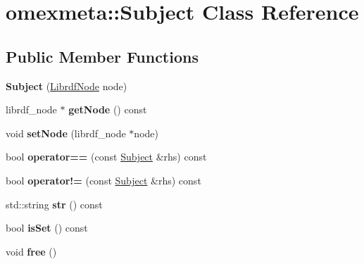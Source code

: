 \hypertarget{classomexmeta_1_1Subject}{}\section{omexmeta\+:\+:Subject Class Reference}
\label{classomexmeta_1_1Subject}
\subsection*{Public Member Functions}
\begin{DoxyCompactItemize}
\item 
\mbox{\label{classomexmeta_1_1Subject_a4e80ab7745a8c2cf6628e8e93a95cdac}} 
{\bfseries Subject} (\hyperlink{classredland_1_1LibrdfNode}{Librdf\+Node} node)
\item 
\mbox{\label{classomexmeta_1_1Subject_a91ea148978a5320dfba19bdb1bdbdd90}} 
librdf\+\_\+node $\ast$ {\bfseries get\+Node} () const
\item 
\mbox{\label{classomexmeta_1_1Subject_aa04b4e973bd7df44fffe588e31b8779f}} 
void {\bfseries set\+Node} (librdf\+\_\+node $\ast$node)
\item 
\mbox{\label{classomexmeta_1_1Subject_a1b170dceee7bf297843da5b201e06693}} 
bool {\bfseries operator==} (const \hyperlink{classomexmeta_1_1Subject}{Subject} \&rhs) const
\item 
\mbox{\label{classomexmeta_1_1Subject_a3729c201061ff27fc50b1ae2412dab2b}} 
bool {\bfseries operator!=} (const \hyperlink{classomexmeta_1_1Subject}{Subject} \&rhs) const
\item 
\mbox{\label{classomexmeta_1_1Subject_a3aa59bfd78d3c6e138beb386d846a584}} 
std\+::string {\bfseries str} () const
\item 
\mbox{\label{classomexmeta_1_1Subject_a1b4c539f6310fc0c834cc44afb275c32}} 
bool {\bfseries is\+Set} () const
\item 
\mbox{\label{classomexmeta_1_1Subject_ac21da4aad49780ba33322de5b7f87756}} 
void {\bfseries free} ()
\end{DoxyCompactItemize}
